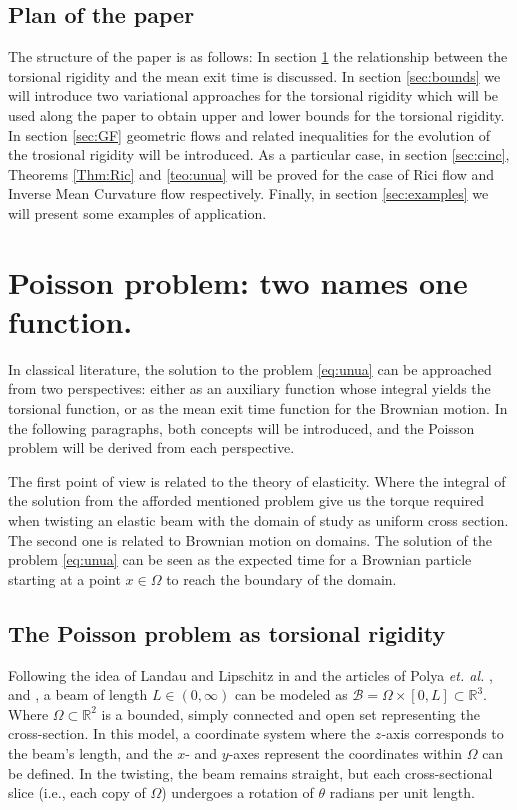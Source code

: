 \documentclass{amsart}
\theoremstyle{definition}
\theoremstyle{remark}
\begin{document}
\subsection{Plan of the paper }
 The structure of the paper is as follows: In section \ref{sec:torormean} the relationship between the torsional rigidity and the mean exit time is discussed.
In section \ref{sec:bounds} we will introduce two variational approaches for the torsional rigidity which will be used along the paper to obtain  upper and lower bounds for the torsional rigidity. In section \ref{sec:GF} geometric flows and related inequalities for the evolution of the trosional rigidity will be introduced. As a particular case, in section \ref{sec:cinc},  Theorems \ref{Thm:Ric} and \ref{teo:unua} will be proved for the case of Rici flow and Inverse Mean Curvature flow respectively. Finally, in section \ref{sec:examples} we will present some examples of application.


\section{Poisson problem: two names one function. }\label{sec:torormean} 
In classical literature, the solution to the problem \eqref{eq:unua} can be approached from two perspectives: either as an auxiliary function whose integral yields the torsional function, or as the mean exit time function for the Brownian motion. In the following paragraphs, both concepts will be introduced, and the Poisson problem will be derived from each perspective.

The first point of view is related to the theory of elasticity. Where the integral of the solution from the afforded mentioned problem give us the torque required when twisting an elastic beam with the domain of study as  uniform cross section. The second one is related to Brownian motion on domains. The solution of the problem \eqref{eq:unua} can be seen as the expected time for a Brownian particle starting at a point $x\in \Omega$ to reach the boundary of the domain.


\subsection{The Poisson problem as torsional rigidity }
Following the idea of Landau and Lipschitz in \cite{LL} and the articles of Polya \textit{et. al.}  \cite{PolyaSV}, \cite{Plya1948TorsionalRP} and \cite{Polya_Variational}, a beam of length \(L \in (0, \infty)\) can be modeled as \(\mathcal{B} = \Omega \times [0, L] \subset \mathbb{R}^3\). Where \(\Omega \subset \mathbb{R}^2\) is a bounded, simply connected and open set representing the cross-section.
  In this model, a coordinate system where the \(z\)-axis corresponds to the beam's length, and the \(x\)- and \(y\)-axes represent the coordinates within \(\Omega\) can be defined.
In the twisting,  the beam remains straight, but each cross-sectional slice (i.e., each copy of \(\Omega\)) undergoes a rotation of \(\theta\) radians per unit length.
\end{document}
